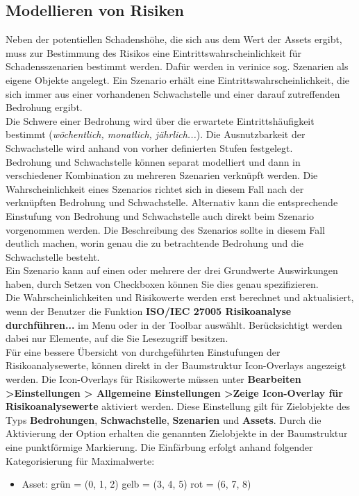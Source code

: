 \documentclass[a4paper,10pt]{book}
\begin{document}
\subsection{Modellieren von Risiken}
Neben der potentiellen Schadenshöhe, die sich aus dem Wert der Assets ergibt, muss zur Bestimmung des Risikos eine Eintrittswahrscheinlichkeit für Schadensszenarien bestimmt werden. Dafür werden in verinice sog. Szenarien als eigene Objekte angelegt. Ein Szenario erhält eine Eintrittswahrscheinlichkeit, die sich immer aus einer vorhandenen Schwachstelle und einer darauf zutreffenden Bedrohung ergibt.
\newline\\
Die Schwere einer Bedrohung wird über die erwartete Eintrittshäufigkeit bestimmt ({\em wöchentlich, monatlich, jährlich...}). Die Ausnutzbarkeit der Schwachstelle wird anhand von vorher definierten Stufen festgelegt.
\newline\\
Bedrohung und Schwachstelle können separat modelliert und dann in verschiedener Kombination zu mehreren Szenarien verknüpft werden. Die Wahrscheinlichkeit eines Szenarios richtet sich in diesem Fall nach der verknüpften Bedrohung und Schwachstelle. Alternativ kann die entsprechende Einstufung von Bedrohung und Schwachstelle auch direkt beim Szenario vorgenommen werden. Die Beschreibung des Szenarios sollte in diesem Fall deutlich machen, worin genau die zu betrachtende Bedrohung und die Schwachstelle besteht.
\newline\\
Ein Szenario kann auf einen oder mehrere der drei Grundwerte Auswirkungen haben, durch Setzen von Checkboxen können Sie dies genau spezifizieren.
\newline\\
Die Wahrscheinlichkeiten und Risikowerte werden erst berechnet und aktualisiert, wenn der Benutzer die Funktion \textbf{ISO/IEC 27005 Risikoanalyse durchführen...} im Menu oder in der Toolbar auswählt. Berücksichtigt werden dabei nur Elemente, auf die Sie Lesezugriff besitzen.
\newline\\
Für eine bessere Übersicht von durchgeführten Einstufungen der Risikoanalysewerte, können direkt in der Baumstruktur
Icon-Overlays angezeigt werden. Die Icon-Overlays für Risikowerte müssen unter \textbf {Bearbeiten \textgreater Einstellungen \textgreater
Allgemeine Einstellungen \textgreater Zeige Icon-Overlay für Risikoanalysewerte} aktiviert werden. Diese Einstellung gilt für
Zielobjekte des Typs \textbf {Bedrohungen}, \textbf {Schwachstelle}, \textbf {Szenarien} und \textbf {Assets}. Durch die Aktivierung der Option
erhalten die genannten Zielobjekte in der Baumstruktur eine punktförmige Markierung. Die Einfärbung erfolgt anhand folgender Kategorisierung für Maximalwerte:
\begin{itemize}
 \item Asset:
 \subitem grün = (0, 1, 2)
 \subitem gelb = (3, 4, 5)
 \subitem rot = (6, 7, 8)
\end{itemize}
\end{document}

